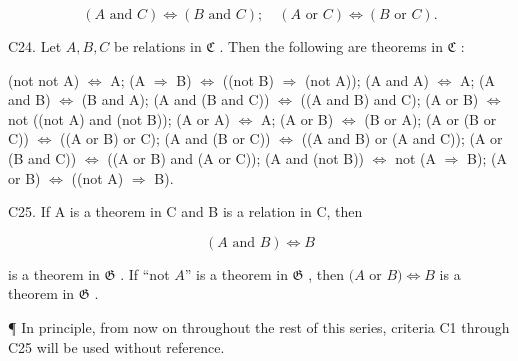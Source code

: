 \[
(A \text {   and   } C) \Longleftrightarrow (B \text {   and   } C); \quad (A \text {   or   } C) \Longleftrightarrow (B \text {   or   } C).
\]

C24. Let \(A, B, C\) be relations in \(\mathfrak{C}\) . Then the following are theorems in \(\mathfrak{C}\) :

(not not A) \(\Longleftrightarrow\) A; (A \(\Longrightarrow\) B) \(\Longleftrightarrow\) ((not B) \(\Longrightarrow\) (not A)); (A and A) \(\Longleftrightarrow\) A; (A and B) \(\Longleftrightarrow\) (B and A); (A and (B and C)) \(\Longleftrightarrow\) ((A and B) and C); (A or B) \(\Longleftrightarrow\) not ((not A) and (not B)); (A or A) \(\Longleftrightarrow\) A; (A or B) \(\Longleftrightarrow\) (B or A); (A or (B or C)) \(\Longleftrightarrow\) ((A or B) or C); (A and (B or C)) \(\Longleftrightarrow\) ((A and B) or (A and C)); (A or (B and C)) \(\Longleftrightarrow\) ((A or B) and (A or C)); (A and (not B)) \(\Longleftrightarrow\) not (A \(\Longrightarrow\) B); (A or B) \(\Longleftrightarrow\) ((not A) \(\Longrightarrow\) B).

C25. If A is a theorem in C and B is a relation in C, then

\[
(A \text {   and   } B) \Longleftrightarrow B
\]

is a theorem in \(\mathfrak{G}\) . If ``not \(A\)'' is a theorem in \(\mathfrak{G}\) , then \((A\) or \(B) \Longleftrightarrow B\) is a theorem in \(\mathfrak{G}\) .

¶ In principle, from now on throughout the rest of this series, criteria C1 through C25 will be used without reference.

